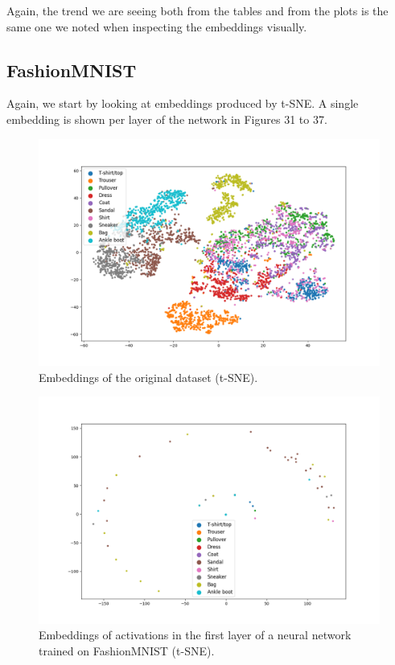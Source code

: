 \documentclass{article}
\begin{document}
Again, the trend we are seeing both from the tables and from the plots is the
same one we noted when inspecting the embeddings visually.

\subsection{FashionMNIST}
Again, we start by looking at embeddings produced by t-SNE. A single embedding
is shown per layer of the network in Figures 31 to 37.

\begin{figure}
  \centering
    \includegraphics[width=1.0\textwidth]{../../out/activations_cnn/fmnist/t-sne/trained/plot_l0.png}
    \caption{Embeddings of the original dataset (t-SNE).}
\end{figure}

\begin{figure}
  \centering
    \includegraphics[width=1.0\textwidth]{../../out/activations_cnn/fmnist/t-sne/trained/plot_l1_f0.png}
    \caption{Embeddings of activations in the first layer of a neural network trained on FashionMNIST (t-SNE).}
\end{figure}
\end{document}

